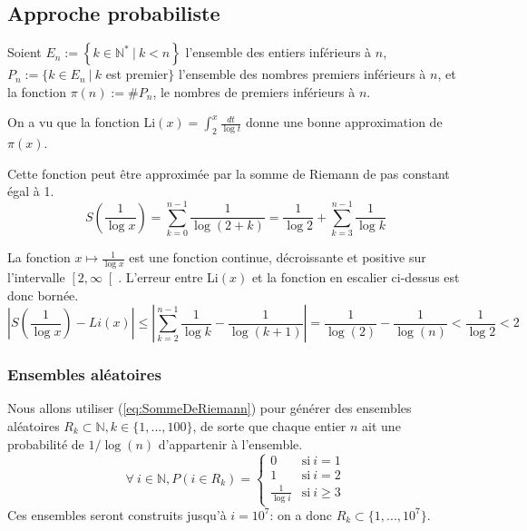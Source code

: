 \documentclass[../main.tex]{report}
\begin{document}
    \label{sec:test1}
    
\subsection{Approche probabiliste}
Soient $E_n := \left\{ k \in \mathbb{N}^* ~|~k < n \right\}$ l'ensemble des entiers inférieurs à $n$, $ P_n := \{k \in E_n~|~ k$ est premier$ \}$ l'ensemble des nombres premiers inférieurs à $n$, et la fonction $\pi (n) := \#P_n$, le nombres de premiers inférieurs à $n$.

On a vu que la fonction Li$(x) = \int_2^x \frac{dt}{\log t}$ 
donne une bonne approximation de $\pi(x)$.

Cette fonction peut être approximée par la somme de Riemann de pas constant égal à 1.
\begin{equation}
\label{eq:SommeDeRiemann}
S \left({\frac{1}{\log x}} \right)
= \sum_{k=0}^{n-1} \frac{1}{\log(2 + k)}
= \frac{1}{\log 2} + \sum_{k=3}^{n-1} \frac{1}{\log k}
\end{equation}


La fonction $x \mapsto \frac{1}{\log x}$ est une fonction continue, décroissante et positive sur l'intervalle $\left[2, \infty \right[$. 
L'erreur entre Li$(x)$ et la fonction en escalier ci-dessus est donc bornée. 
 \[ 
\left| S\left(\frac{1}{\log x}\right) - Li(x) \right|
\leq \left| \sum_{k=2}^{n-1} \frac{1}{\log k} - \frac{1}{\log (k+1)} \right| 
 = \frac{1}{\log (2)} - \frac{1}{\log (n)}
 < \frac{1}{\log 2}
 < 2
 \]


\subsubsection{Ensembles aléatoires} 

Nous allons utiliser (\ref{eq:SommeDeRiemann}) pour générer des ensembles aléatoires $R_{k} \subset \mathbb{N}, k \in \{1,...,100\}$, de sorte que chaque entier $n$ ait une probabilité de $1/\log(n)$ d'appartenir à l'ensemble. 
\[
\forall~i \in \mathbb{N}, P(i \in R_{k}) = 
\left\{ 
    \begin{array}{cl}
         0 & \mbox{si}~i = 1 \\
         1 & \mbox{si}~i = 2 \\
         \frac{1}{\log i} & \mbox{si}~i \geq 3
    \end{array}
\right.
\]
Ces ensembles seront construits jusqu'à $i = 10^7$: on a donc $R_k \subset \{1,...,10^7\}$. 
\end{document}
